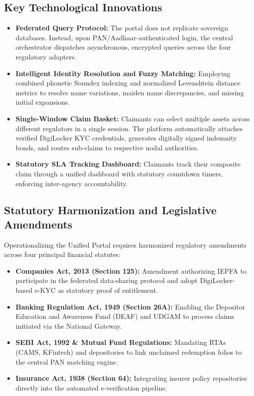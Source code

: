 \documentclass[openany]{book}
\begin{document}
\subsection{Key Technological Innovations}
\begin{itemize}
    \item \textbf{Federated Query Protocol:} The portal does not replicate sovereign databases. Instead, upon PAN/Aadhaar-authenticated login, the central orchestrator dispatches asynchronous, encrypted queries across the four regulatory adapters.
    \item \textbf{Intelligent Identity Resolution and Fuzzy Matching:} Employing combined phonetic Soundex indexing and normalized Levenshtein distance metrics to resolve name variations, maiden name discrepancies, and missing initial expansions.
    \item \textbf{Single-Window Claim Basket:} Claimants can select multiple assets across different regulators in a single session. The platform automatically attaches verified DigiLocker KYC credentials, generates digitally signed indemnity bonds, and routes sub-claims to respective nodal authorities.
    \item \textbf{Statutory SLA Tracking Dashboard:} Claimants track their composite claim through a unified dashboard with statutory countdown timers, enforcing inter-agency accountability.
\end{itemize}

\subsection{Statutory Harmonization and Legislative Amendments}
Operationalizing the Unified Portal requires harmonized regulatory amendments across four principal financial statutes:
\begin{itemize}
    \item \textbf{Companies Act, 2013 (Section 125):} Amendment authorizing IEPFA to participate in the federated data-sharing protocol and adopt DigiLocker-based e-KYC as statutory proof of entitlement.
    \item \textbf{Banking Regulation Act, 1949 (Section 26A):} Enabling the Depositor Education and Awareness Fund (DEAF) and UDGAM to process claims initiated via the National Gateway.
    \item \textbf{SEBI Act, 1992 \& Mutual Fund Regulations:} Mandating RTAs (CAMS, KFintech) and depositories to link unclaimed redemption folios to the central PAN matching engine.
    \item \textbf{Insurance Act, 1938 (Section 64):} Integrating insurer policy repositories directly into the automated e-verification pipeline.
\end{itemize}


\end{document}
